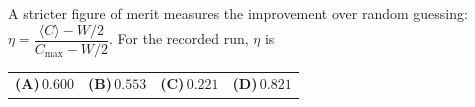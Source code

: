 \documentclass[11pt,a4paper]{article}
\newcommand{\optlabel}[1]{\textbf{(#1)}}
\newenvironment{qitem}[1]{\begin{list}{}{\setlength{\leftmargin}{3.3em}\setlength{\labelwidth}{3.1em}%
  \setlength{\labelsep}{0.2em}\setlength{\topsep}{3pt}\setlength{\parsep}{3pt}}\item[\textbf{Q.#1}\hfill]}{\end{list}}
\newcommand{\qsep}{\par\vspace{2pt}{\color{black!15}\hrule}\vspace{4pt}}
\begin{document}
\begin{qitem}{80}
A stricter figure of merit measures the improvement over random guessing:
$\eta = \dfrac{\langle C\rangle - W/2}{C_{\max} - W/2}$. For the recorded run, $\eta$ is
\par\smallskip\noindent\begin{tabularx}{\linewidth}{@{}*{4}{L}@{}}
\optlabel{A}\,$0.600$ & \optlabel{B}\,$0.553$ & \optlabel{C}\,$0.221$ & \optlabel{D}\,$0.821$
\end{tabularx}
\end{qitem}
\qsep

\newpage
\end{document}
